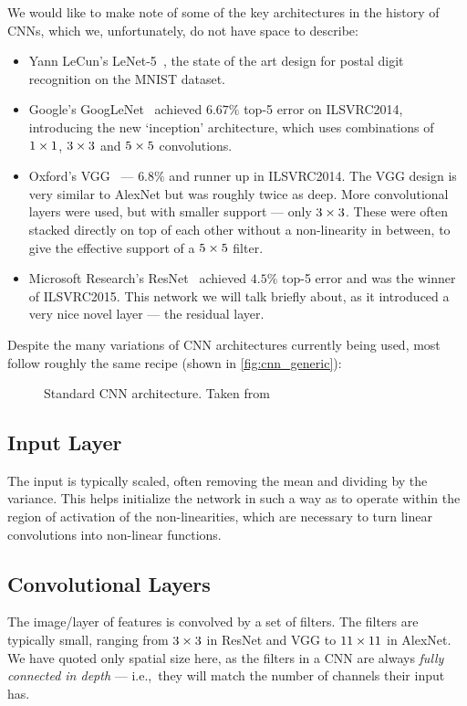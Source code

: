   We would like to make note of some of the key architectures
  in the history of CNNs, which we, unfortunately, do not have space to describe:
  \begin{itemize}
    \item Yann LeCun's LeNet-5~\citep{lecun_gradient-based_1998}, the state of the art
      design for postal digit recognition on the MNIST dataset.
    \item Google's GoogLeNet~\citep{szegedy_going_2015} achieved $6.67\%$ top-5
      error on ILSVRC2014, introducing the new `inception' architecture, which
      uses combinations of $1\times 1$, $3\times 3$ and $5\times 5$ convolutions.
    \item Oxford's VGG~\citep{simonyan_very_2014} --- $6.8\%$ and runner up in
      ILSVRC2014. The VGG design is very similar to AlexNet but was roughly
      twice as deep. More convolutional layers were used, but with smaller
      support --- only $3\times 3$. These were often stacked directly on top of
      each other without a non-linearity in between, to give the effective
      support of a $5\times 5$ filter.
    \item Microsoft Research's ResNet~\citep{he_deep_2015} achieved $4.5\%$ top-5 
      error and was the winner of ILSVRC2015. This network we will talk briefly
      about, as it introduced a very nice novel layer --- the residual layer.
  \end{itemize}

  Despite the many variations of CNN architectures currently being used, most
  follow roughly the same recipe (shown in \autoref{fig:cnn_generic}):
  \begin{figure}
    \centering
      \caption[Standard CNN architecture]
              {Standard CNN architecture. Taken
              from~\citep{lecun_gradient-based_1998}}\label{fig:cnn_generic}
  \end{figure}

\subsection{Input Layer}\label{sec:cnn_input} 
  The input is typically scaled, often removing the mean and dividing by the
  variance. This helps initialize the network in such a way as to operate
  within the region of activation of the non-linearities, which are necessary
  to turn linear convolutions into non-linear functions. 

\subsection{Convolutional Layers}\label{sec:cnn_conv} 
  The image/layer of features is convolved by a set of filters.
  The filters are typically small, ranging from $3\times 3$ in ResNet and VGG
  to $11\times 11$ in AlexNet. We have quoted only spatial size
  here, as the filters in a CNN are always \emph{fully connected in depth} ---
  i.e.,\ they will match the number of channels their input has.

